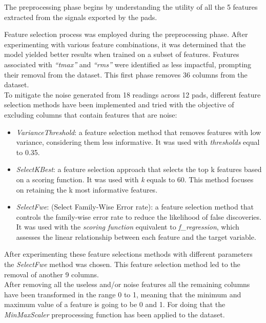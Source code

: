 \documentclass[conference]{IEEEtran}
\begin{document}
The preprocessing phase begins by understanding the utility of all the 5 features extracted 
from the signals exported by the pads.

Feature selection process was employed during the preprocessing phase. After experimenting with 
various feature combinations, it was determined that the model yielded better results when 
trained on a subset of features. \cite{OpenAI_ChatGPT_help_me_on_this}
Features associated with \textit{“tmax”} and \textit{“rms”} were identified as less impactful, 
prompting their removal from the dataset.
This first phase removes 36 columns from the dataset.\\

To mitigate the noise generated from 18 readings across 12 pads, different feature 
selection methods have been implemented and tried with the objective of excluding 
columns that contain features that are noise:

\begin{itemize}
    \item \textit{VarianceThreshold}: a feature selection method that removes features with low variance, 
    considering them less informative. It was used with \textit{thresholds} equal to 0.35.
    \item \textit{SelectKBest}: a feature selection approach that selects the top k features 
    based on a scoring function. 
    It was used with \textit{k} equals to 60. This method focuses on retaining the k 
    most informative features.
    \item \textit{SelectFwe}: (Select Family-Wise Error rate): a feature selection method 
    that controls the family-wise error rate to reduce the likelihood of false discoveries. 
    It was used with the \textit{scoring function} equivalent to \textit{f\_regression}, 
    which assesses the linear relationship between each feature and the target 
    variable. \cite{OpenAI_ChatGPT_help_me_on_this}
\end{itemize}

After experimenting these feature selections methods with different parameters the \textit{SelectFwe} method 
was chosen. This feature selection method led to the removal of another 9 columns.\\

After removing all the useless and/or noise features all the remaining columns have been transformed 
in the range 0 to 1, meaning that the minimum and maximum value of a feature is going to be 0 and 1. 
For doing that the \textit{MinMaxScaler} preprocessing function has been applied to the dataset.
\end{document}
